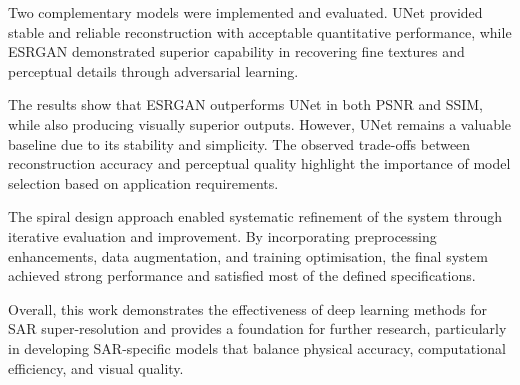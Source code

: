 \documentclass[conference]{IEEEtran}
\begin{document}
Two complementary models were implemented and evaluated. UNet provided stable and reliable reconstruction with acceptable quantitative performance, while ESRGAN demonstrated superior capability in recovering fine textures and perceptual details through adversarial learning.

The results show that ESRGAN outperforms UNet in both PSNR and SSIM, while also producing visually superior outputs. However, UNet remains a valuable baseline due to its stability and simplicity. The observed trade-offs between reconstruction accuracy and perceptual quality highlight the importance of model selection based on application requirements.

The spiral design approach enabled systematic refinement of the system through iterative evaluation and improvement. By incorporating preprocessing enhancements, data augmentation, and training optimisation, the final system achieved strong performance and satisfied most of the defined specifications.

Overall, this work demonstrates the effectiveness of deep learning methods for SAR super-resolution and provides a foundation for further research, particularly in developing SAR-specific models that balance physical accuracy, computational efficiency, and visual quality.



\end{document}
